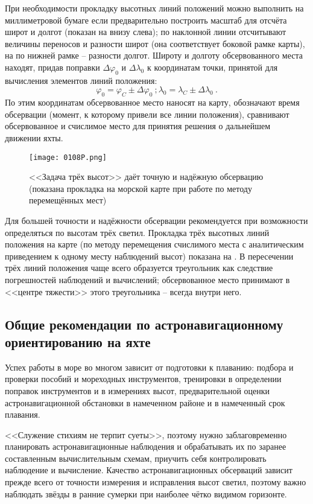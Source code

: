 При необходимости прокладку высотных линий положений можно выполнить
на миллиметровой бумаге если предварительно построить масштаб для
отсчёта широт и долгот (показан на  внизу слева); по
наклонной линии отсчитывают величины переносов и разности широт (она
соответствует боковой рамке карты), на по нижней рамке \--- разности
долгот. Широту и долготу обсервованного места находят, придав поправки
$\Delta \varphi_0$ и $\Delta \lambda_0$ к координатам точки, принятой
для вычисления элементов линий положения:
%
\begin{equation}
  \label{eq:77}
  \varphi_0 = \varphi_C \pm \Delta \varphi_0 \ ;
  \lambda_0 = \lambda_C \pm \Delta \lambda_0 \ .
\end{equation}
%
По этим координатам обсервованное место наносят на карту, обозначают
время обсервации (момент, к которому привели все линии положения),
сравнивают обсервованное и счислимое место для принятия решения о
дальнейшем движении яхты.

\begin{figure*}[!htb]
  \centering
  \texttt{[image: 0108P.png]}
  \caption[Задача трёх высот]{<<Задача трёх высот>> даёт точную и
    надёжную обсервацию (показана прокладка на морской карте при
    работе по методу перемещённых мест)}
  \label{fig:108}
\end{figure*}

Для большей точности и надёжности обсервации рекомендуется при
возможности определяться по высотам трёх светил. Прокладка трёх
высотных линий положения на карте (по методу перемещения счислимого
места с аналитическим приведением к одному месту наблюдений высот)
показана на . В пересечении трёх линий положения чаще всего
образуется треугольник как следствие погрешностей наблюдений и
вычислений; обсервованное место принимают в <<центре тяжести>> этого
треугольника \--- всегда внутри него.

\subsection{Общие рекомендации по астронавигационному ориентированию на яхте}

Успех работы в море во многом зависит от подготовки к плаванию:
подбора и проверки пособий и мореходных инструментов, тренировки в
определении поправок инструментов и в измерениях высот,
предварительной оценки астронавигационной обстановки в намеченном
районе и в намеченный срок плавания.

<<Служение стихиям не терпит суеты>>, поэтому нужно заблаговременно
планировать астронавигационные наблюдения и обрабатывать их по заранее
составленным вычислительным схемам, приучить себя контролировать
наблюдение и вычисление. Качество астронавигационных обсерваций
зависит прежде всего от точности измерения и исправления высот светил,
поэтому важно наблюдать звёзды в ранние сумерки при наиболее чётко
видимом горизонте.

